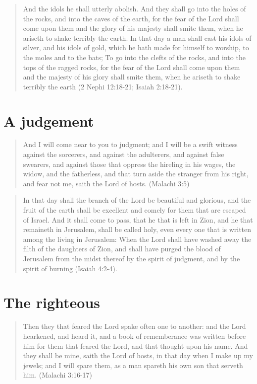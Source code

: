 \begin{quotation}
And the idols he shall utterly abolish. And they shall go into the holes of the rocks, and into the caves of the earth, for the fear of the Lord shall come upon them and the glory of his majesty shall smite them, when he ariseth to shake terribly the earth. In that day a man shall cast his idols of silver, and his idols of gold, which he hath made for himself to worship, to the moles and to the bats; To go into the clefts of the rocks, and into the tops of the ragged rocks, for the fear of the Lord shall come upon them and the majesty of his glory shall smite them, when he ariseth to shake terribly the earth (2 Nephi 12:18-21; Isaiah 2:18-21).
\end{quotation}


\section{A judgement}

\begin{quotation}
And I will come near to you to judgment; and I will be a swift witness against the sorcerers, and against the adulterers, and against false swearers, and against those that oppress the hireling in his wages, the widow, and the fatherless, and that turn aside the stranger from his right, and fear not me, saith the Lord of hosts. (Malachi 3:5)
\end{quotation}

\begin{quotation}
In that day shall the branch of the Lord be beautiful and glorious, and the fruit of the earth shall be excellent and comely for them that are escaped of Israel. And it shall come to pass, that he that is left in Zion, and he that remaineth in Jerusalem, shall be called holy, even every one that is written among the living in Jerusalem: When the Lord shall have washed away the filth of the daughters of Zion, and shall have purged the blood of Jerusalem from the midst thereof by the spirit of judgment, and by the spirit of burning (Isaiah 4:2-4).
\end{quotation}


\section{The righteous}

\begin{quotation}
Then they that feared the Lord spake often one to another: and the Lord hearkened, and heard it, and a book of rememberance was written before him for them that feared the Lord, and that thought upon his name. And they shall be mine, saith the Lord of hosts, in that day when I make up my jewels; and I will spare them, as a man spareth his own son that serveth him. (Malachi 3:16-17)
\end{quotation}

